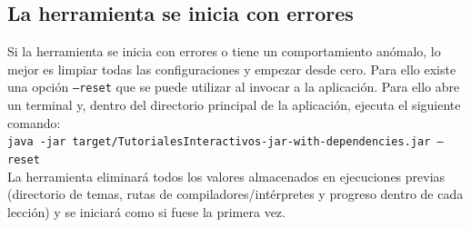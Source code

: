 \documentclass[]{article}
\begin{document}


\subsection{La herramienta se inicia con errores}
Si la herramienta se inicia con errores o tiene un comportamiento anómalo, lo mejor es limpiar todas las configuraciones y empezar desde cero. Para ello existe una opción \texttt{--reset} que se puede utilizar al invocar a la aplicación. Para ello abre un terminal y, dentro del directorio principal de la aplicación, ejecuta el siguiente comando:\\[0.2cm]
{\small \texttt{java -jar target/TutorialesInteractivos-jar-with-dependencies.jar --reset}}\\[0.2cm]
La herramienta eliminará todos los valores almacenados en ejecuciones previas (directorio de temas, rutas de compiladores/intérpretes y progreso dentro de cada lección) y se iniciará como si fuese la primera vez. 
\end{document}
